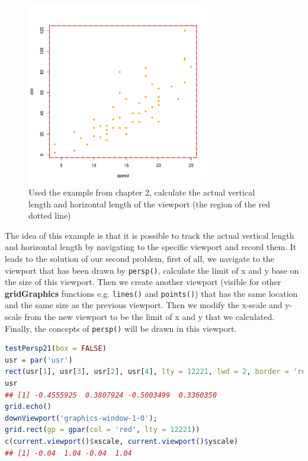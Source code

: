 \documentclass{report}
\begin{document}
\begin{figure}[h]
	\begin{center}
		\includegraphics[height = 8cm, width = 8cm]{figure/gridGraphics_persp_demo_1.pdf}
		\caption{Used the example from chapter 2, calculate the actual vertical length and horizontal length of the viewport (the region of the red dotted line)}
		\label{figure_4.2}
	\end{center}
\end{figure}

\newpage
The idea of this example is that it is possible to track the actual vertical length and horizontal length by navigating to the specific viewport and record them. It leads to the solution of our second problem, first of all, we navigate to the viewport that has been drawn by \texttt{persp()}, calculate the limit of x and y base on the size of this viewport. Then we create another viewport (visible for other \textbf{gridGraphics} functions e.g. \texttt{lines()} and \texttt{points()}) that has the same location and the same size as the previous viewport. Then we modify the x-scale and y-scale from the new viewport to be the limit of x and y that we calculated. Finally, the concepts of \texttt{persp()} will be drawn in this viewport. \\

\begin{lstlisting}[language = R]
testPersp21(box = FALSE)
usr = par('usr')
rect(usr[1], usr[3], usr[2], usr[4], lty = 12221, lwd = 2, border = 'red')
usr
## [1] -0.4555925  0.3807924 -0.5003499  0.3360350
grid.echo()
downViewport('graphics-window-1-0'); 
grid.rect(gp = gpar(col = 'red', lty = 12221))
c(current.viewport()$xscale, current.viewport()$yscale)
## [1] -0.04  1.04 -0.04  1.04
\end{lstlisting}
\end{document}
